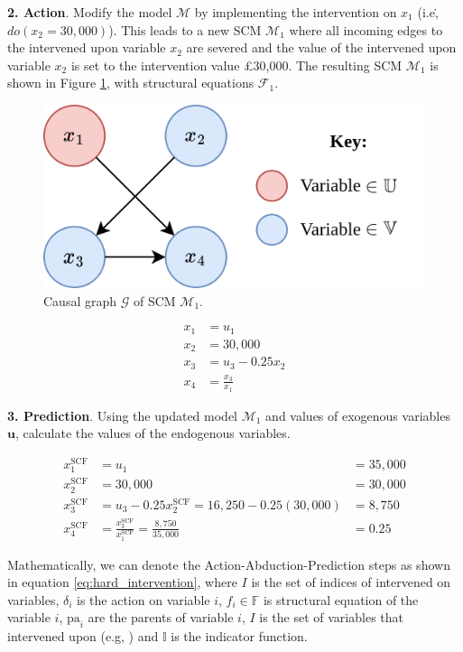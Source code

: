 \textbf{2. Action}. Modify the model $\mathcal{M}$ by implementing the intervention on $x_1$ (i.e\., $do(x_2=30,000)$). This leads to a new SCM $\mathcal{M}_1$ where all incoming edges to the intervened upon variable $x_2$ are severed and the value of the intervened upon variable $x_2$ is set to the intervention value £30,000. The resulting SCM $\mathcal{M}_1$ is shown in Figure \ref{fig:toy_scm_severed}, with structural equations $\mathcal{F}_1$.

\begin{figure}[!htb]
	\centering
	\includegraphics[width=0.6\linewidth]{images/draw.io/Simple SCM Severed.png}
	\caption{Causal graph $\mathcal{G}$ of SCM $\mathcal{M}_1$.}
	\label{fig:toy_scm_severed}
\end{figure}

\begin{align}
	x_1 & = u_1 \\ \nonumber
	x_2 & = 30,000 \\ \nonumber
	x_3 & = u_3 - 0.25x_2 \\ \nonumber %
	x_4 & = \frac{x_3}{x_1} %
\end{align}

\textbf{3. Prediction}. Using the updated model $\mathcal{M}_1$ and values of exogenous variables $\mathbf{u}$, calculate the values of the endogenous variables.

\begin{align}
	x^{\text{SCF}}_1 & = u_1 &  = 35,000 \\ \nonumber
	x^{\text{SCF}}_2 & = 30,000 & = 30,000 \\ \nonumber
	x^{\text{SCF}}_3 & = u_3 - 0.25x^{\text{SCF}}_2 = 16,250 - 0.25(30,000) & = 8,750 \\ \nonumber
	x^{\text{SCF}}_4 & = \frac{x^{\text{SCF}}_3}{x^{\text{SCF}}_1} = \frac{8,750}{35,000} & = 0.25
\end{align}

Mathematically, we can denote the Action-Abduction-Prediction steps as shown in equation \ref{eq:hard_intervention}, where $I$ is the set of indices of intervened on variables, $\delta_i$ is the action on variable $i$, $f_i \in \mathbb{F}$ is structural equation of the variable $i$,  $\text{pa}_i$ are the parents of variable $i$, $I$ is the set of variables that intervened upon (e.g, ) and $\mathbb{I}$ is the indicator function. 

